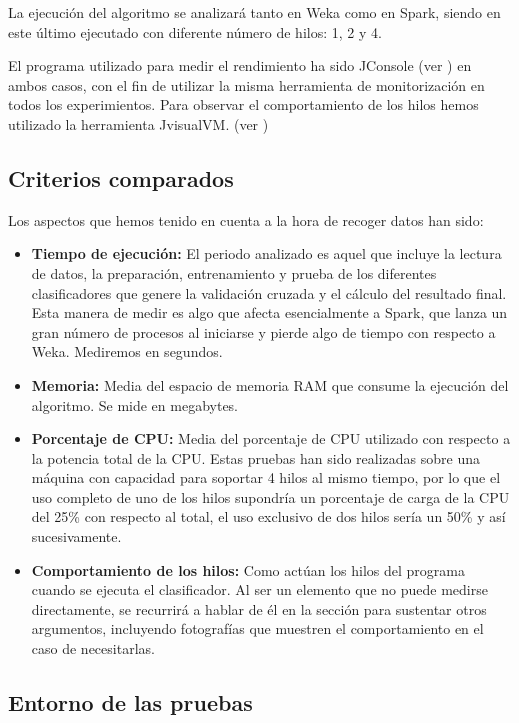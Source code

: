 La ejecución del algoritmo se analizará tanto en Weka como en Spark, siendo en este último ejecutado con diferente número de hilos: 1, 2 y 4.

El programa utilizado para medir el rendimiento ha sido JConsole (ver ) en ambos casos, con el fin de utilizar la misma herramienta de monitorización en todos los experimientos.
Para observar el comportamiento de los hilos hemos utilizado la herramienta JvisualVM. (ver )

\subsection{Criterios comparados}

Los aspectos que hemos tenido en cuenta a la hora de recoger datos han sido:

\begin{itemize}
	\item \textbf{Tiempo de ejecución:} El periodo analizado es aquel que incluye la lectura de datos, la preparación, entrenamiento y prueba de los diferentes clasificadores que genere la validación cruzada y el cálculo del resultado final. Esta manera de medir es algo que afecta esencialmente a Spark, que lanza un gran número de procesos al iniciarse y pierde algo de tiempo con respecto a Weka. Mediremos en segundos.
	\item \textbf{Memoria:} Media del espacio de memoria RAM que consume la ejecución del algoritmo. Se mide en megabytes.
	\item \textbf{Porcentaje de CPU:} Media del porcentaje de CPU utilizado con respecto a la potencia total de la CPU. Estas pruebas han sido realizadas sobre una máquina con capacidad para soportar 4 hilos al mismo tiempo, por lo que el uso completo de uno de los hilos supondría un porcentaje de carga de la CPU del 25\% con respecto al total, el uso exclusivo de dos hilos sería un 50\% y así sucesivamente.
	\item \textbf{Comportamiento de los hilos:} Como actúan los hilos del programa cuando se ejecuta el clasificador. Al ser un elemento que no puede medirse directamente, se recurrirá a hablar de él en la sección  para sustentar otros argumentos, incluyendo fotografías que muestren el comportamiento en el caso de necesitarlas.
\end{itemize}

\subsection{Entorno de las pruebas}


